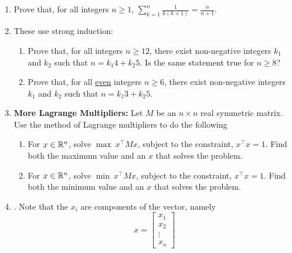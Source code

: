 \documentclass[letterpaper]{article}
\begin{document}
\begin{enumerate}
\item Prove that, for all integers $n \ge 1$, $\sum \limits_{k=1}^{n} \frac{1}{k(k+1)} = \frac{n}{n+1}$.

\item These use strong induction:
\begin{enumerate}
\setlength{\itemsep}{.1in}
\renewcommand{\labelenumi}{(\alph{enumi})}
\item  Prove that, for all integers $n \ge 12$, there exist non-negative integers $k_1$ and $k_2$ such that $n=k_1 4 + k_2 5$. Is the same statement true for $n \ge 8$?

\item Prove that, for all \underline{even} integers $n\ge 6$, there exist non-negative integers $k_1$ and $k_2$ such that $n=k_1 3 + k_2 5$.

\end{enumerate}

\newpage

\item \textbf{More Lagrange Multipliers:} Let $M$ be an $n \times n$ real symmetric matrix. Use the method of Lagrange multipliers to do the following
\begin{enumerate}
\setlength{\itemsep}{.1in}
\renewcommand{\labelenumi}{(\alph{enumi})}
\item For $x\in \mathbb R^n$, solve $\max~x^\top M x$, subject to the constraint, $x^\top x = 1$. Find both the maximum value and an $x$ that solves the problem.

\item For $x\in \mathbb R^n$, solve $\min~x^\top M x$, subject to the constraint, $x^\top x = 1$. Find both the minimum value and an $x$ that solves the problem.

\end{enumerate}


\item {}. Note that the $x_i$ are components of the vector, namely
$$x = \left[ \begin{array}{c} x_1 \\ x_2 \\ \vdots \\ x_n \end{array} \right] $$



\end{enumerate}
\end{document}
